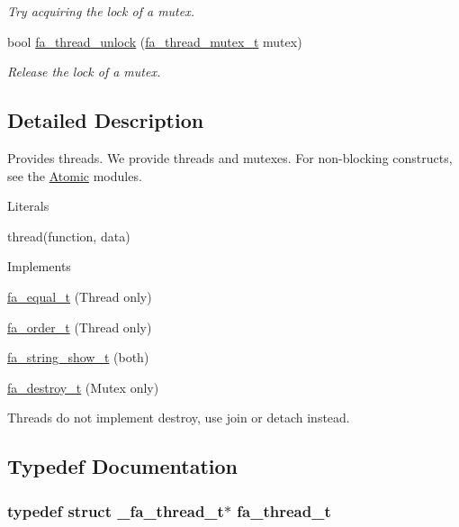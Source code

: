 \begin{DoxyCompactItemize}
\begin{DoxyCompactList}\small\item\em Try acquiring the lock of a mutex. \end{DoxyCompactList}\item 
bool \hyperlink{group___fa_thread_gae96ce639c555f06c1b22a6ba2967e124}{fa\-\_\-thread\-\_\-unlock} (\hyperlink{group___fa_thread_ga659c355795f6866eec71ecd8eeadbd59}{fa\-\_\-thread\-\_\-mutex\-\_\-t} mutex)
\begin{DoxyCompactList}\small\item\em Release the lock of a mutex. \end{DoxyCompactList}\end{DoxyCompactItemize}


\subsection{Detailed Description}
Provides threads. We provide threads and mutexes. For non-\/blocking constructs, see the \hyperlink{group___fa_atomic}{Atomic} modules.

\begin{DoxyParagraph}{Literals}

\begin{DoxyItemize}
\item {\ttfamily thread(function, data)}
\end{DoxyItemize}
\end{DoxyParagraph}
\begin{DoxyParagraph}{Implements }

\begin{DoxyItemize}
\item \hyperlink{structfa__equal__t}{fa\-\_\-equal\-\_\-t} (Thread only)
\item \hyperlink{structfa__order__t}{fa\-\_\-order\-\_\-t} (Thread only)
\item \hyperlink{structfa__string__show__t}{fa\-\_\-string\-\_\-show\-\_\-t} (both)
\item \hyperlink{structfa__destroy__t}{fa\-\_\-destroy\-\_\-t} (Mutex only)
\end{DoxyItemize}
\end{DoxyParagraph}
Threads do not implement destroy, use join or detach instead. 

\subsection{Typedef Documentation}
\hypertarget{group___fa_thread_gaec6debf84c8113cb354a7352b4e17abd}{
\subsubsection[{fa\-\_\-thread\-\_\-t}]{\setlength{\rightskip}{0pt plus 5cm}typedef struct \-\_\-fa\-\_\-thread\-\_\-t$\ast$ {\bf fa\-\_\-thread\-\_\-t}}}\label{group___fa_thread_gaec6debf84c8113cb354a7352b4e17abd}


